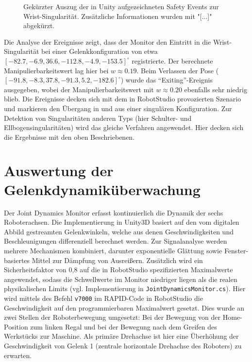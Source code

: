 \begin{figure}[H]
  \inputminted[fontsize=\footnotesize,breaklines]{json}{code-snippets/singularityerror.json}
  \caption{Gekürzter Auszug der in Unity aufgezeichneten Safety
    Events zur Wrist-Singularität. Zusätzliche Informationen wurden mit "[...]"
  abgekürzt.}
  \label{lst:singularity_json}
\end{figure}

Die Analyse der Ereignisse zeigt, dass der Monitor den Eintritt in
die Wrist-Singularität
bei einer Gelenkkonfiguration von etwa
$[-82.7, -6.9, 36.6, -112.8, -4.9, -153.5]^\circ$ registrierte. Der berechnete
Manipulierbarkeitswert lag hier bei $w \approx 0.19$. Beim Verlassen der Pose
($[-91.8, -8.3, 37.8, -91.3, 5.2, -182.6]^\circ$) wurde das
\enquote{Exiting}-Ereignis
ausgegeben, wobei der Manipulierbarkeitswert mit $w \approx 0.20$
ebenfalls sehr niedrig blieb.
Die Ereignisse decken sich mit dem in RobotStudio provozierten
Szenario und markieren den
Übergang in und aus einer singulären Konfiguration.
Zur Detektion von Singularitäten anderen Typs (hier Schulter- und
Ellbogensingularitäten) wird das gleiche Verfahren angewendet. Hier decken sich
die Ergebnisse mit den oben Beschriebenen.

\section{Auswertung der Gelenkdynamiküberwachung}
\label{sec:Analyse_Sicherheit}
Der Joint Dynamics Monitor erfasst kontinuierlich die Dynamik der sechs
Roboterachsen. Die Implementierung in Unity3D basiert auf den vom digitalen
Abbild gestreamten Gelenkwinkeln, welche aus denen Geschwindigkeiten und
Beschleunigungen differenziell berechnet werden. Zur Signalanalyse werden
mehrere Mechanismen kombiniert, darunter exponentielle Glättung sowie
Fenster-basiertes Mittel zur Dämpfung von Ausreißern. Zusätzlich wird ein
Sicherheitsfaktor von 0{,}8 auf die in RobotStudio spezifizierten Maximalwerte
angewendet, sodass die Schwellwerte im Monitor niedriger liegen als die realen
physikalischen Limits (vgl. Implementierung in
\texttt{JointDynamicsMonitor.cs}). Hier wird mittels des Befehl \texttt{v7000}
im RAPID-Code in RobotStudio die Geschwindigkeit auf den programmierbaren
Maximalwert gesetzt. Dies wurde an zwei Stellen der Roboterbewegung umgesetzt:
Bei der Bewegung von der Home-Position zum linken Regal und bei der Bewegung
nach dem Greifen des Werkstücks zur Maschine. Als primäre Drehachse ist hier
eine Überhöhung der Geschwindigkeit von Gelenk 1 (zentrale horizontale Drehachse
des Roboters) zu erwarten.

